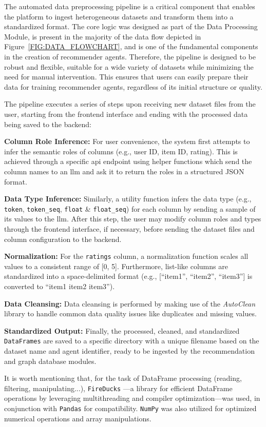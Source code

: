 The automated data preprocessing pipeline is a critical component that enables the platform to ingest heterogeneous datasets and transform them into a standardized format. The core logic was designed as part of the Data Processing Module, is present in the majority of the data flow depicted in Figure~\ref{FIG:DATA_FLOWCHART}, and is one of the fundamental components in the creation of recommender agents. Therefore, the pipeline is designed to be robust and flexible, suitable for a wide variety of datasets while minimizing the need for manual intervention. This ensures that users can easily prepare their data for training recommender agents, regardless of its initial structure or quality.

The pipeline executes a series of steps upon receiving new dataset files from the user, starting from the frontend interface and ending with the processed data being saved to the backend:
\begin{compactenum}
    \item \textbf{Column Role Inference:} For user convenience, the system first attempts to infer the semantic roles of columns (e.g., user ID, item ID, rating). This is achieved through a specific \acs{api} endpoint using helper functions which send the column names to an \ac{llm} and ask it to return the roles in a structured JSON format.
    \item \textbf{Data Type Inference:} Similarly, a utility function infers the data type (e.g., \texttt{token}, \texttt{token\_seq}, \texttt{float} \& \texttt{float\_seq}) for each column by sending a sample of its values to the \ac{llm}. After this step, the user may modify column roles and types through the frontend interface, if necessary, before sending the dataset files and column configuration to the backend.
    \item \textbf{Normalization:} For the \texttt{ratings} column, a normalization function scales all values to a consistent range of [0, 5]. Furthermore, list-like columns are standardized into a space-delimited format (e.g., [``item1'', ``item2'', ``item3''] is converted to ``item1 item2 item3'').
    \item \textbf{Data Cleansing:} Data cleansing is performed by making use of the \textit{AutoClean} library \cite{AUTOCLEAN} to handle common data quality issues like duplicates and missing values.
    \item \textbf{Standardized Output:} Finally, the processed, cleaned, and standardized \texttt{DataFrames} are saved to a specific directory with a unique filename based on the dataset name and agent identifier, ready to be ingested by the recommendation and graph database modules.
\end{compactenum}

It is worth mentioning that, for the task of DataFrame processing (reading, filtering, manipulating...), \texttt{FireDucks} \cite{FIREDUCKS}---a library for efficient DataFrame operations by leveraging multithreading and compiler optimization---was used, in conjunction with \texttt{Pandas} \cite{PANDAS} for compatibility. \texttt{NumPy} \cite{NUMPY} was also utilized for optimized numerical operations and array manipulations.